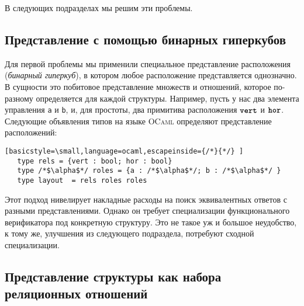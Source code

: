 \noindent В следующих подразделах мы решим эти проблемы.

\subsection{Представление с помощью бинарных гиперкубов}

Для первой проблемы мы применили специальное представление расположения (\emph{бинарный гиперкуб}), в котором любое расположение представляется однозначно.
В сущности это побитовое представление множеств и отношений, которое по-разному определяется для каждой структуры.
Например, пусть у нас два элемента управления \lstinline|a| и \lstinline|b|, и, для простоты, два примитива расположения $\mbox{\texttt{\textbf{vert}}}$ и $\mbox{\texttt{\textbf{hor}}}$.
Следующие объявления типов на языке  \textsc{OCaml} определяют представление расположений:


\begin{lstlisting}[basicstyle=\small,language=ocaml,escapeinside={/*}{*/} ]
   type rels = {vert : bool; hor : bool}
   type /*$\alpha$*/ roles = {a : /*$\alpha$*/; b : /*$\alpha$*/ }
   type layout  = rels roles roles
\end{lstlisting}

Этот подход нивелирует накладные расходы на поиск эквивалентных ответов с разными представлениями.
Однако он требует специализации функционального верификатора под конкретную структуру.
Это не такое уж и большое неудобство, к тому же, улучшения из следующего подраздела, потребуют сходной специализации.


\subsection{Представление структуры как набора реляционных отношений}

